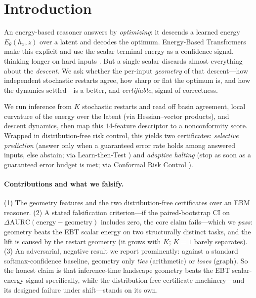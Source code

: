 \section{Introduction}
\label{sec:intro}

An energy-based reasoner answers by \emph{optimizing}: it descends a learned energy $E_\theta(h_x,z)$
over a latent and decodes the optimum. Energy-Based Transformers make this explicit and use the
scalar terminal energy as a confidence signal, thinking longer on hard inputs \citep{ebt2025}. But a
single scalar discards almost everything about the \emph{descent}. We ask whether the per-input
\emph{geometry} of that descent---how independent stochastic restarts agree, how sharp or flat the
optimum is, and how the dynamics settled---is a better, and \emph{certifiable}, signal of
correctness.

We run inference from $K$ stochastic restarts and read off basin agreement, local curvature of the
energy over the latent (via Hessian--vector products), and descent dynamics, then map this
$14$-feature descriptor to a nonconformity score. Wrapped in distribution-free risk control, this
yields two certificates: \emph{selective prediction} (answer only when a guaranteed error rate holds
among answered inputs, else abstain; via Learn-then-Test \citep{ltt2021}) and \emph{adaptive halting}
(stop as soon as a guaranteed error budget is met; via Conformal Risk Control \citep{crc2022}).

\paragraph{Contributions and what we falsify.} (1) The geometry features and the two
distribution-free certificates over an EBM reasoner. (2) A stated falsification criterion---if the
paired-bootstrap CI on $\Delta\mathrm{AURC}(\text{energy}-\text{geometry})$ includes zero, the core
claim fails---which we \emph{pass}: geometry beats the EBT scalar energy on two structurally distinct
tasks, and the lift is caused by the restart geometry (it grows with $K$; $K{=}1$ barely separates).
(3) An adversarial, negative result we report prominently: against a standard softmax-confidence
baseline, geometry only \emph{ties} (arithmetic) or \emph{loses} (graph). So the honest claim is that
inference-time landscape geometry beats the EBT scalar-energy signal specifically, while the
distribution-free certificate machinery---and its designed failure under shift---stands on its own.

